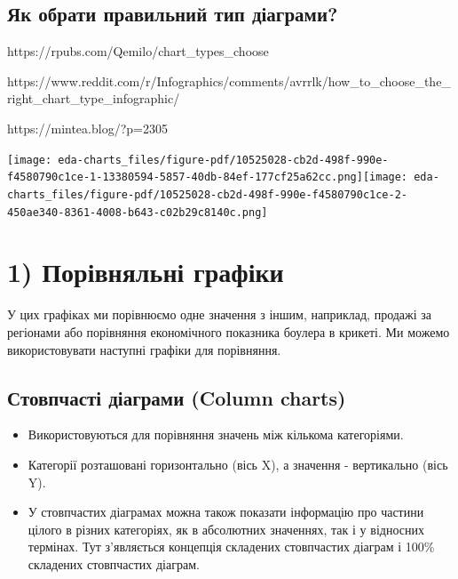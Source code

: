 \documentclass[
  letterpaper,
  DIV=11,
  numbers=noendperiod]{scrreprt}
\providecommand{\tightlist}{%
  \setlength{\itemsep}{0pt}\setlength{\parskip}{0pt}}\usepackage{longtable,booktabs,array}
\begin{document}
\section{Як обрати правильний тип
діаграми?}\label{ux44fux43a-ux43eux431ux440ux430ux442ux438-ux43fux440ux430ux432ux438ux43bux44cux43dux438ux439-ux442ux438ux43f-ux434ux456ux430ux433ux440ux430ux43cux438}

https://rpubs.com/Qemilo/chart\_types\_choose

https://www.reddit.com/r/Infographics/comments/avrrlk/how\_to\_choose\_the\_right\_chart\_type\_infographic/

https://mintea.blog/?p=2305

\texttt{[image: eda-charts\_files/figure-pdf/10525028-cb2d-498f-990e-f4580790c1ce-1-13380594-5857-40db-84ef-177cf25a62cc.png]}\texttt{[image: eda-charts\_files/figure-pdf/10525028-cb2d-498f-990e-f4580790c1ce-2-450ae340-8361-4008-b643-c02b29c8140c.png]}

\chapter{1) Порівняльні
графіки}\label{ux43fux43eux440ux456ux432ux43dux44fux43bux44cux43dux456-ux433ux440ux430ux444ux456ux43aux438}

У цих графіках ми порівнюємо одне значення з іншим, наприклад, продажі
за регіонами або порівняння економічного показника боулера в крикеті. Ми
можемо використовувати наступні графіки для порівняння.

\section{Стовпчасті діаграми (Column
charts)}\label{ux441ux442ux43eux432ux43fux447ux430ux441ux442ux456-ux434ux456ux430ux433ux440ux430ux43cux438-column-charts}

\begin{itemize}
\tightlist
\item
  Використовуються для порівняння значень між кількома категоріями.
\item
  Категорії розташовані горизонтально (вісь X), а значення - вертикально
  (вісь Y).
\item
  У стовпчастих діаграмах можна також показати інформацію про частини
  цілого в різних категоріях, як в абсолютних значеннях, так і у
  відносних термінах. Тут з'являється концепція складених стовпчастих
  діаграм і 100\% складених стовпчастих діаграм.
\end{itemize}
\end{document}
